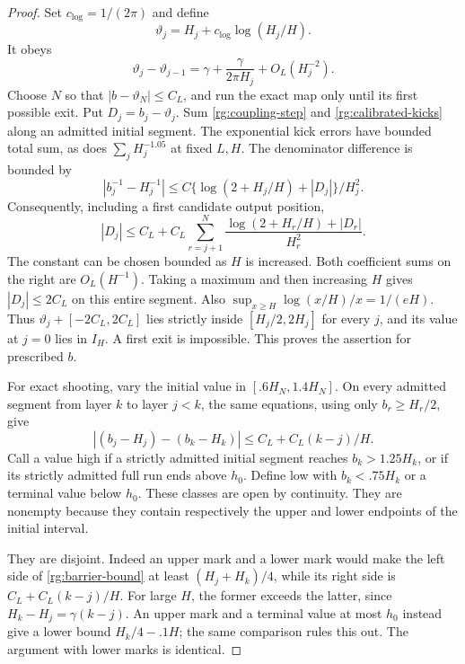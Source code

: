 \begin{proof}
Set $c_{\log}=1/(2\pi)$ and define
\[
 \vartheta_j=H_j+c_{\log}\log(H_j/H).
\]
It obeys
\[
 \vartheta_j-\vartheta_{j-1}
    =\gamma+\frac{\gamma}{2\pi H_j}
                       +O_L(H_j^{-2}).
\]
Choose $N$ so that $|b-\vartheta_N|\le C_L$, and run the exact
map only until its first possible exit.  Put
$D_j=b_j-\vartheta_j$.  Sum
\eqref{rg:coupling-step} and \eqref{rg:calibrated-kicks} along
an admitted initial segment.  The exponential kick errors
have bounded total sum, as does $\sum_jH_j^{-1.05}$ at fixed
$L,H$.  The denominator difference is bounded by
\[
 |b_j^{-1}-H_j^{-1}|
 \le C\{\log(2+H_j/H)+|D_j|\}/H_j^2 .
\]
Consequently, including a first candidate output position,
\begin{equation}
 |D_j|\le C_L+
 C_L\sum_{r=j+1}^N
       \frac{\log(2+H_r/H)+|D_r|}{H_r^2}.
 \label{rg:first-exit-bound}
\end{equation}
The constant can be chosen bounded as $H$ is increased.
Both coefficient sums on the right are $O_L(H^{-1})$.
Taking a maximum and then increasing $H$ gives
$|D_j|\le2C_L$ on this entire segment.
Also $\sup_{x\ge H}\log(x/H)/x=1/(eH)$.
Thus $\vartheta_j+[-2C_L,2C_L]$ lies strictly inside
$[H_j/2,2H_j]$ for every $j$, and its value at $j=0$
lies in $I_H$.  A first exit is impossible.  This proves
the assertion for prescribed $b$.

For exact shooting, vary the initial value in
$[.6H_N,1.4H_N]$.  On every admitted segment from layer
$k$ to layer $j<k$, the same equations, using only
$b_r\ge H_r/2$, give
\begin{equation}
 |(b_j-H_j)-(b_k-H_k)|
       \le C_L+C_L(k-j)/H .
 \label{rg:barrier-bound}
\end{equation}
Call a value high if a strictly admitted initial segment
reaches $b_k>1.25H_k$, or if its strictly admitted full run
ends above $h_0$.  Define low with $b_k<.75H_k$ or a terminal
value below $h_0$.  These classes are open by continuity.
They are nonempty because they contain respectively the
upper and lower endpoints of the initial interval.

They are disjoint.  Indeed an upper mark and a lower mark
would make the left side of \eqref{rg:barrier-bound} at least
$(H_j+H_k)/4$, while its right side is
$C_L+C_L(k-j)/H$.  For large $H$, the former exceeds the
latter, since $H_k-H_j=\gamma(k-j)$.  An upper mark and a
terminal value at most $h_0$ instead give a lower bound
$H_k/4-.1H$; the same comparison rules this out.
The argument with lower marks is identical.


\end{proof}
